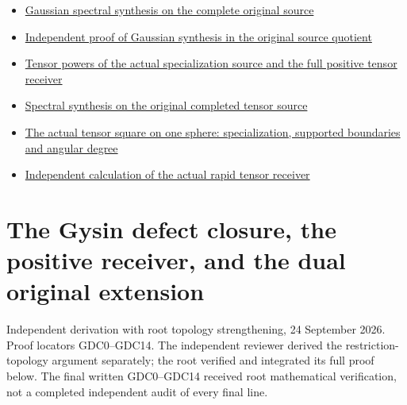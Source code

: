 \begin{itemize}
{  approximation on the complete original source and its actual defect}
\item
  \href{https://github.com/KokunoYumeto/zeta-function-research-reader/blob/main/workbenches/splitzero-tandem/continuations/20260925-full-source-tensor-and-original-divisor/gct/GAUSSIAN_SPECTRAL_SYNTHESIS.md}{Gaussian
  spectral synthesis on the complete original source}
\item
  \href{https://github.com/KokunoYumeto/zeta-function-research-reader/blob/main/workbenches/splitzero-tandem/continuations/20260925-full-source-tensor-and-original-divisor/gct/GAUSSIAN_SPECTRAL_SYNTHESIS_INDEPENDENT.md}{Independent
  proof of Gaussian synthesis in the original source quotient}
\item
  \href{https://github.com/KokunoYumeto/zeta-function-research-reader/blob/main/workbenches/splitzero-tandem/continuations/20260925-full-source-tensor-and-original-divisor/gct/ACTUAL_SPECIALIZATION_TENSOR_WEIGHT_COMPARISON.md}{Tensor
  powers of the actual specialization source and the full positive
  tensor receiver}
\item
  \href{https://github.com/KokunoYumeto/zeta-function-research-reader/blob/main/workbenches/splitzero-tandem/continuations/20260925-full-source-tensor-and-original-divisor/gct/COMPLETED_TENSOR_SOURCE_SYNTHESIS.md}{Spectral
  synthesis on the original completed tensor source}
\item
  \href{https://github.com/KokunoYumeto/zeta-function-research-reader/blob/main/workbenches/splitzero-tandem/continuations/20260925-full-source-tensor-and-original-divisor/gct/ACTUAL_FIXED_BASE_TENSOR_SQUARE.md}{The
  actual tensor square on one sphere: specialization, supported
  boundaries and angular degree}
\item
  \href{https://github.com/KokunoYumeto/zeta-function-research-reader/blob/main/workbenches/splitzero-tandem/continuations/20260925-full-source-tensor-and-original-divisor/gct/TENSOR_RECEIVER_INDEPENDENT_CHECK.md}{Independent
  calculation of the actual rapid tensor receiver}
\end{itemize}

\chapter{The Gysin defect closure, the positive receiver, and the dual
original
extension}\label{the-gysin-defect-closure-the-positive-receiver-and-the-dual-original-extension}

Independent derivation with root topology strengthening, 24 September
2026. Proof locators GDC0--GDC14. The independent reviewer derived the
restriction-topology argument separately; the root verified and
integrated its full proof below. The final written GDC0--GDC14 received
root mathematical verification, not a completed independent audit of
every final line.

